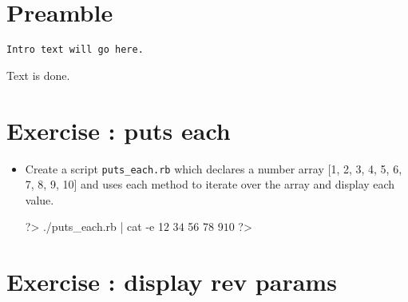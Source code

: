 \documentclass{42-en}
\begin{document}
\chapter{Preamble}

\begin{verbatim}
Intro text will go here.
\end{verbatim}
Text is done.

\startexercices


\chapter{Exercise \exercicenumber: puts each}

\exnumber{\exercicenumber}


\begin{itemize}

\item Create a script \texttt{puts\_each.rb} which declares a number array [1, 2, 3, 4, 5, 6, 7, 8, 9, 10] and uses each method to iterate over the array and display each value.

\begin{42console}
	?> ./puts_each.rb | cat -e
	1$
	2$
	3$
	4$
	5$
	6$
	7$
	8$
	9$
	10$
	?>
\end{42console}

\end{itemize}



\chapter{Exercise \exercicenumber: display rev params}
\end{document}
